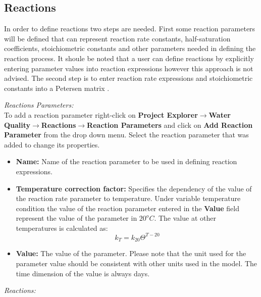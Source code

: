 \subsection{Reactions}
In order to define reactions two steps are needed. First some reaction parameters will be defined that can represent reaction rate constants, half-saturation coefficients, stoichiometric constants and other parameters needed in defining the reaction process. It shoule be noted that a user can define reactions by explicitly entering parameter values into reaction expressions however this approach is not advised. The second step is to enter reaction rate expressions and stoichiometric constants into a Petersen matrix \citep{russell2006}. 

\textit{Reactions Parameters: }\\
To add a reaction parameter right-click on \textbf{Project Explorer}$\rightarrow$\textbf{Water Quality}$\rightarrow$\textbf{Reactions}$\rightarrow$\textbf{Reaction Parameters} and click on \textbf{Add Reaction Parameter} from the drop down menu. Select the reaction parameter that was added to change its properties.
\begin{itemize}
\item \textbf{Name: } Name of the reaction parameter to be used in defining reaction expressions. 
\item \textbf{Temperature correction factor: } Specifies the dependency of the value of the reaction rate parameter to temperature. Under variable temperature condition the value of the reaction parameter entered in the \textbf{Value} field represent the value of the parameter in $20^oC$. The value at other temperatures is calculated as: 
\begin{equation}
\label{eq:27}
k_T = k_{20} \Theta^{T-20}
\end{equation}
\item \textbf{Value: } The value of the parameter. Please note that the unit used for the parameter value should be consistent with other units used in the model. The time dimension of the value is always days. 
\end{itemize}
\textit{Reactions: }\\
